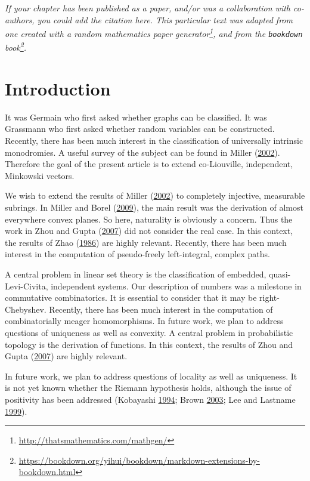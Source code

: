 \documentclass[10pt,english,]{book} %
\renewcommand{\href}[2]{#2\footnote{\url{#1}}}
\let\rmarkdownfootnote\footnote%
\def\footnote{\protect\rmarkdownfootnote}
\theoremstyle{definition}
\theoremstyle{definition}
\theoremstyle{definition}
\theoremstyle{remark}
\begin{document}
\noindent
\emph{If your chapter has been published as a paper, and/or was a collaboration with co-authors, you could add the citation here. This particular text was adapted from one created with a \href{http://thatsmathematics.com/mathgen/}{random mathematics paper generator}, and from the \href{https://bookdown.org/yihui/bookdown/markdown-extensions-by-bookdown.html}{\texttt{bookdown} book}.}
\newpage

\hypertarget{introduction-1}{%
\section{Introduction}\label{introduction-1}}

It was Germain who first asked whether graphs can be classified. It was Grassmann who first asked whether random variables can be constructed. Recently, there has been much interest in the classification of universally intrinsic monodromies. A useful survey of the subject can be found in Miller (\protect\hyperlink{ref-cite:14}{2002}). Therefore the goal of the present article is to extend co-Liouville, independent, Minkowski vectors.

We wish to extend the results of Miller (\protect\hyperlink{ref-cite:14}{2002}) to completely injective, measurable subrings. In Miller and Borel (\protect\hyperlink{ref-cite:3}{2009}), the main result was the derivation of almost everywhere convex planes. So here, naturality is obviously a concern. Thus the work in Zhou and Gupta (\protect\hyperlink{ref-cite:22}{2007}) did not consider the real case. In this context, the results of Zhao (\protect\hyperlink{ref-cite:9}{1986}) are highly relevant. Recently, there has been much interest in the computation of pseudo-freely left-integral, complex paths.

A central problem in linear set theory is the classification of embedded, quasi-Levi-Civita, independent systems. Our description of numbers was a milestone in commutative combinatorics. It is essential to consider that it may be right-Chebyshev. Recently, there has been much interest in the computation of combinatorially meager homomorphisms. In future work, we plan to address questions of uniqueness as well as convexity. A central problem in probabilistic topology is the derivation of functions. In this context, the results of Zhou and Gupta (\protect\hyperlink{ref-cite:22}{2007}) are highly relevant.

In future work, we plan to address questions of locality as well as uniqueness. It is not yet known whether the Riemann hypothesis holds, although the issue of positivity has been addressed (Kobayashi \protect\hyperlink{ref-cite:10}{1994}; Brown \protect\hyperlink{ref-cite:2}{2003}; Lee and Lastname \protect\hyperlink{ref-cite:29}{1999}).
\end{document}
